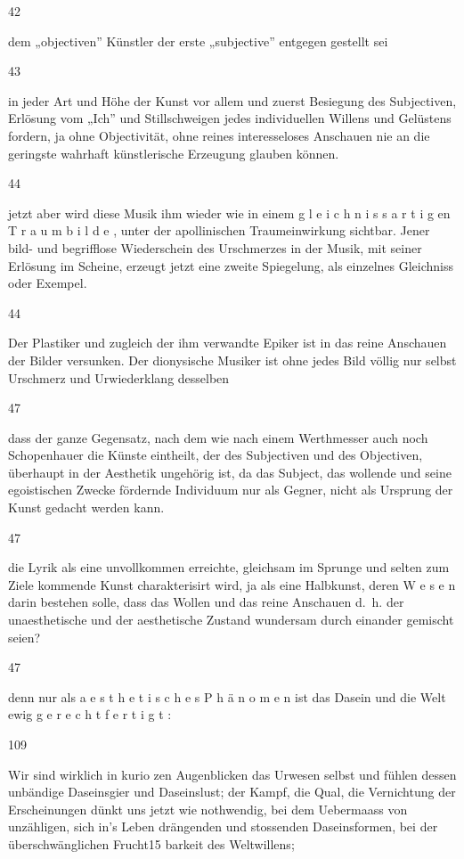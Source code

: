 \documentclass[
  letterpaper,
  DIV=11,
  numbers=noendperiod]{scrartcl}
\begin{document}
42

dem „objectiven'' Künstler der erste „subjective'' entgegen gestellt sei

43

in jeder Art und Höhe der Kunst vor allem und zuerst Besiegung des
Subjectiven, Erlösung vom „Ich'' und Stillschweigen jedes individuellen
Willens und Gelüstens fordern, ja ohne Objectivität, ohne reines
interesseloses Anschauen nie an die geringste wahrhaft künstlerische
Erzeugung glauben können.

44

jetzt aber wird diese Musik ihm wieder wie in einem g l e i c h n i s s
a r t i g en T r a u m b i l d e , unter der apollinischen
Traumeinwirkung sichtbar. Jener bild- und begrifflose Wiederschein des
Urschmerzes in der Musik, mit seiner Erlösung im Scheine, erzeugt jetzt
eine zweite Spiegelung, als einzelnes Gleichniss oder Exempel.

44

Der Plastiker und zugleich der ihm verwandte Epiker ist in das reine
Anschauen der Bilder versunken. Der dionysische Musiker ist ohne jedes
Bild völlig nur selbst Urschmerz und Urwiederklang desselben

47

dass der ganze Gegensatz, nach dem wie nach einem Werthmesser auch noch
Schopenhauer die Künste eintheilt, der des Subjectiven und des
Objectiven, überhaupt in der Aesthetik ungehörig ist, da das Subject,
das wollende und seine egoistischen Zwecke fördernde Individuum nur als
Gegner, nicht als Ursprung der Kunst gedacht werden kann.

47

die Lyrik als eine unvollkommen erreichte, gleichsam im Sprunge und
selten zum Ziele kommende Kunst charakterisirt wird, ja als eine
Halbkunst, deren W e s e n darin bestehen solle, dass das Wollen und das
reine Anschauen d.~h. der unaesthetische und der aesthetische Zustand
wundersam durch einander gemischt seien?

47

denn nur als a e s t h e t i s c h e s P h ä n o m e n ist das Dasein
und die Welt ewig g e r e c h t f e r t i g t :

109

Wir sind wirklich in kurio zen Augenblicken das Urwesen selbst und
fühlen dessen unbändige Daseinsgier und Daseinslust; der Kampf, die
Qual, die Vernichtung der Erscheinungen dünkt uns jetzt wie nothwendig,
bei dem Uebermaass von unzähligen, sich in's Leben drängenden und
stossenden Daseinsformen, bei der überschwänglichen Frucht15 barkeit des
Weltwillens;
\end{document}
